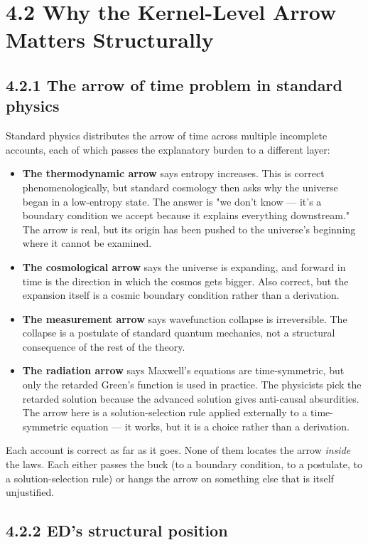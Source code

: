 \documentclass[11pt]{book}
\begin{document}
\section{4.2 Why the Kernel-Level Arrow Matters Structurally}

\subsection{4.2.1 The arrow of time problem in standard physics}

Standard physics distributes the arrow of time across multiple incomplete accounts, each of which passes the explanatory burden to a different layer:

\begin{itemize}
\item \textbf{The thermodynamic arrow} says entropy increases. This is correct phenomenologically, but standard cosmology then asks why the universe began in a low-entropy state. The answer is "we don't know — it's a boundary condition we accept because it explains everything downstream." The arrow is real, but its origin has been pushed to the universe's beginning where it cannot be examined.
\item \textbf{The cosmological arrow} says the universe is expanding, and forward in time is the direction in which the cosmos gets bigger. Also correct, but the expansion itself is a cosmic boundary condition rather than a derivation.
\item \textbf{The measurement arrow} says wavefunction collapse is irreversible. The collapse is a postulate of standard quantum mechanics, not a structural consequence of the rest of the theory.
\item \textbf{The radiation arrow} says Maxwell's equations are time-symmetric, but only the retarded Green's function is used in practice. The physicists pick the retarded solution because the advanced solution gives anti-causal absurdities. The arrow here is a solution-selection rule applied externally to a time-symmetric equation — it works, but it is a choice rather than a derivation.
\end{itemize}

Each account is correct as far as it goes. None of them locates the arrow \textit{inside} the laws. Each either passes the buck (to a boundary condition, to a postulate, to a solution-selection rule) or hangs the arrow on something else that is itself unjustified.

\subsection{4.2.2 ED's structural position}
\end{document}
